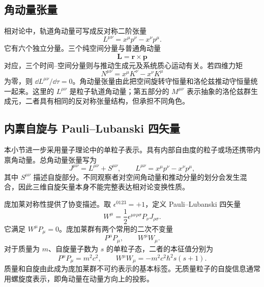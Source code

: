 \documentclass[style=classic,color=full]{lc-article}
\begin{document}
\subsection{角动量张量}

相对论中，轨道角动量可写成反对称二阶张量
\begin{equation}
  L^{\mu\nu}
  =x^\mu p^\nu-x^\nu p^\mu.
  \label{eq:angularmomentumtensor}
\end{equation}
它有六个独立分量。三个纯空间分量与普通角动量
\begin{equation}
  \bm L=\bm r\times\bm p
\end{equation}
对应，三个时间--空间分量则与推动生成元及系统质心运动有关。若四维力矩
\begin{equation}
  N^{\mu\nu}
  =x^\mu K^\nu-x^\nu K^\mu
\end{equation}
为零，则 $\dd L^{\mu\nu}/\dd\tau=0$。角动量张量由此把空间旋转守恒量和洛伦兹推动守恒量统一起来。这里的 $L^{\mu\nu}$ 是粒子轨道角动量；第五部分的 $M^{\mu\nu}$ 表示抽象的洛伦兹群生成元，二者具有相同的反对称张量结构，但承担不同角色。

\subsection{内禀自旋与 Pauli--Lubanski 四矢量}

本小节进一步采用量子理论中的单粒子表示。具有内部自由度的粒子或场还携带内禀角动量。总角动量张量写为
\begin{equation}
  J^{\mu\nu}=L^{\mu\nu}+S^{\mu\nu},
  \qquad
  L^{\mu\nu}=x^\mu p^\nu-x^\nu p^\mu,
  \label{eq:totalangularmomentum}
\end{equation}
其中 $S^{\mu\nu}$ 描述自旋部分。不同观察者对空间角动量和推动分量的划分会发生混合，因此三维自旋矢量本身不能完整表达相对论变换性质。

庞加莱对称性提供了协变描述。取 $\epsilon^{0123}=+1$，定义 Pauli--Lubanski 四矢量
\begin{equation}
  W^\mu
  =\frac{1}{2}\epsilon^{\mu\nu\rho\sigma}
  P_\nu J_{\rho\sigma}.
  \label{eq:paulilubanski}
\end{equation}
它满足 $W^\mu P_\mu=0$。庞加莱群有两个常用的二次不变量
\begin{equation}
  P^\mu P_\mu,
  \qquad
  W^\mu W_\mu.
  \label{eq:poincarecasimirs}
\end{equation}
对于质量为 $m$、自旋量子数为 $s$ 的单粒子态，二者的本征值分别为
\begin{equation}
  P^\mu P_\mu=m^2c^2,
  \qquad
  W^\mu W_\mu=-m^2c^2\hbar^2s(s+1).
  \label{eq:massspincasimirs}
\end{equation}
质量和自旋由此成为庞加莱群不可约表示的基本标签。无质量粒子的自旋信息通常用螺旋度表示，即角动量在动量方向上的投影\cite{weinberg1995}。
\end{document}
